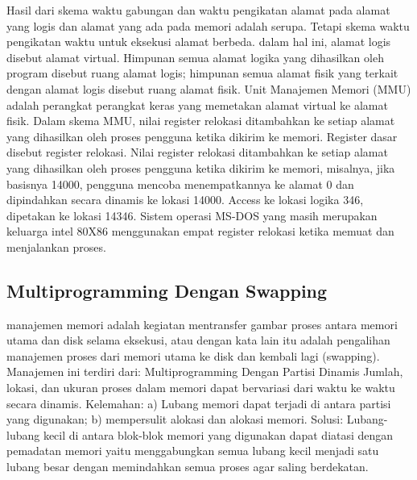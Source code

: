 Hasil dari skema waktu gabungan dan waktu pengikatan alamat pada alamat yang logis dan alamat yang ada pada memori adalah serupa. Tetapi skema waktu pengikatan waktu untuk eksekusi alamat berbeda. dalam hal ini, alamat logis disebut alamat virtual. Himpunan semua alamat logika yang dihasilkan oleh program disebut ruang alamat logis; himpunan semua alamat fisik yang terkait dengan alamat logis disebut ruang alamat fisik.
Unit Manajemen Memori (MMU) adalah perangkat perangkat keras yang memetakan alamat virtual ke alamat fisik. Dalam skema MMU, nilai register relokasi ditambahkan ke setiap alamat yang dihasilkan oleh proses pengguna ketika dikirim ke memori.
Register dasar disebut register relokasi. Nilai register relokasi ditambahkan ke setiap alamat yang dihasilkan oleh proses pengguna ketika dikirim ke memori, misalnya, jika basisnya 14000, pengguna mencoba menempatkannya ke alamat 0 dan dipindahkan secara dinamis ke lokasi 14000. Access ke lokasi logika 346, dipetakan ke lokasi 14346. Sistem operasi MS-DOS yang masih merupakan keluarga intel 80X86 menggunakan empat register relokasi ketika memuat dan menjalankan proses.

\subsection {Multiprogramming Dengan Swapping}
manajemen memori adalah kegiatan mentransfer gambar proses antara memori utama dan disk selama eksekusi, atau dengan kata lain itu adalah pengalihan manajemen proses dari memori utama ke disk dan kembali lagi (swapping). Manajemen ini terdiri dari:
Multiprogramming Dengan Partisi Dinamis
Jumlah, lokasi, dan ukuran proses dalam memori dapat bervariasi dari waktu ke waktu secara dinamis. Kelemahan: a) Lubang memori dapat terjadi di antara partisi yang digunakan; b) mempersulit alokasi dan alokasi memori.
{Solusi}:
Lubang-lubang kecil di antara blok-blok memori yang digunakan dapat diatasi dengan pemadatan memori yaitu menggabungkan semua lubang kecil menjadi satu lubang besar dengan memindahkan semua proses agar saling berdekatan.
 
